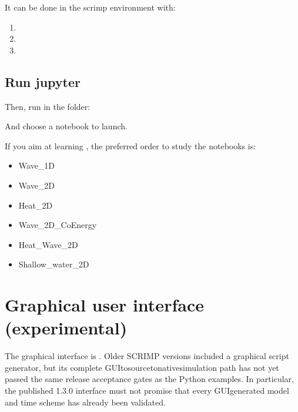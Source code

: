 \documentclass[letterpaper,10pt,english]{sphinxmanual}
\begin{document}
\sphinxAtStartPar
It can be done in the scrimp environment with:
\begin{enumerate}
%
\item {} 
\sphinxAtStartPar
{}

\item {} 
\sphinxAtStartPar
{}

\item {} 
\sphinxAtStartPar
{}

\end{enumerate}


\subsection{Run jupyter}
\label{\detokenize{notebooks:run-jupyter}}
\sphinxAtStartPar
Then, run in the  folder:

\sphinxAtStartPar
{}

\sphinxAtStartPar
And choose a notebook to launch.

\sphinxAtStartPar
If you aim at learning , the preferred order to study the notebooks is:
\begin{itemize}
\item {} 
\sphinxAtStartPar
Wave\_1D

\item {} 
\sphinxAtStartPar
Wave\_2D

\item {} 
\sphinxAtStartPar
Heat\_2D

\item {} 
\sphinxAtStartPar
Wave\_2D\_CoEnergy

\item {} 
\sphinxAtStartPar
Heat\_Wave\_2D

\item {} 
\sphinxAtStartPar
Shallow\_water\_2D

\end{itemize}

\sphinxstepscope


\section{Graphical user interface (experimental)}
\label{\detokenize{GUI:graphical-user-interface-experimental}}\label{\detokenize{GUI::doc}}
\sphinxAtStartPar
The graphical interface is . Older SCRIMP versions included a graphical
script generator, but its complete GUI\sphinxhyphen{}to\sphinxhyphen{}source\sphinxhyphen{}to\sphinxhyphen{}native\sphinxhyphen{}simulation
path has not yet passed the same release acceptance gates as the
Python examples. In particular, the published 1.3.0 interface must
not promise that every GUI\sphinxhyphen{}generated model and time scheme has
already been validated.
\end{document}
